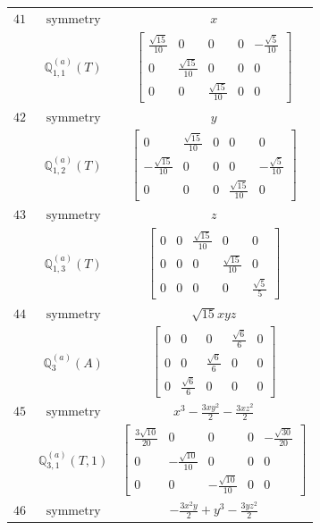 \documentclass[fleqn,8pt,landscape]{jsarticle}
\begin{document}
\begin{longtable}{ccc}
$ 41 $ & $ \text{symmetry} $ & $ x $ \\
$  $ & $ \mathbb{Q}_{1,1}^{(a)}(T) $ & $ \begin{bmatrix} \frac{\sqrt{15}}{10} & 0 & 0 & 0 & - \frac{\sqrt{5}}{10} \\ 0 & \frac{\sqrt{15}}{10} & 0 & 0 & 0 \\ 0 & 0 & \frac{\sqrt{15}}{10} & 0 & 0 \end{bmatrix} $ \\ \hline
$ 42 $ & $ \text{symmetry} $ & $ y $ \\
$  $ & $ \mathbb{Q}_{1,2}^{(a)}(T) $ & $ \begin{bmatrix} 0 & \frac{\sqrt{15}}{10} & 0 & 0 & 0 \\ - \frac{\sqrt{15}}{10} & 0 & 0 & 0 & - \frac{\sqrt{5}}{10} \\ 0 & 0 & 0 & \frac{\sqrt{15}}{10} & 0 \end{bmatrix} $ \\ \hline
$ 43 $ & $ \text{symmetry} $ & $ z $ \\
$  $ & $ \mathbb{Q}_{1,3}^{(a)}(T) $ & $ \begin{bmatrix} 0 & 0 & \frac{\sqrt{15}}{10} & 0 & 0 \\ 0 & 0 & 0 & \frac{\sqrt{15}}{10} & 0 \\ 0 & 0 & 0 & 0 & \frac{\sqrt{5}}{5} \end{bmatrix} $ \\ \hline
$ 44 $ & $ \text{symmetry} $ & $ \sqrt{15} x y z $ \\
$  $ & $ \mathbb{Q}_{3}^{(a)}(A) $ & $ \begin{bmatrix} 0 & 0 & 0 & \frac{\sqrt{6}}{6} & 0 \\ 0 & 0 & \frac{\sqrt{6}}{6} & 0 & 0 \\ 0 & \frac{\sqrt{6}}{6} & 0 & 0 & 0 \end{bmatrix} $ \\ \hline
$ 45 $ & $ \text{symmetry} $ & $ x^{3} - \frac{3 x y^{2}}{2} - \frac{3 x z^{2}}{2} $ \\
$  $ & $ \mathbb{Q}_{3,1}^{(a)}(T,1) $ & $ \begin{bmatrix} \frac{3 \sqrt{10}}{20} & 0 & 0 & 0 & - \frac{\sqrt{30}}{20} \\ 0 & - \frac{\sqrt{10}}{10} & 0 & 0 & 0 \\ 0 & 0 & - \frac{\sqrt{10}}{10} & 0 & 0 \end{bmatrix} $ \\ \hline
$ 46 $ & $ \text{symmetry} $ & $ - \frac{3 x^{2} y}{2} + y^{3} - \frac{3 y z^{2}}{2} $ \\

\end{longtable}
\end{document}
